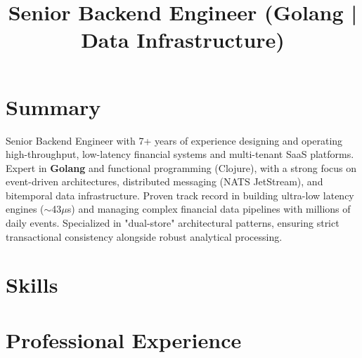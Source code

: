 \documentclass[10pt,a4paper,sans]{moderncv}
\title{Senior Backend Engineer (Golang | Data Infrastructure)}
\begin{document}
\makecvtitle

\section{Summary}
Senior Backend Engineer with 7+ years of experience designing and operating high-throughput, low-latency financial systems and multi-tenant SaaS platforms. Expert in \textbf{Golang} and functional programming (Clojure), with a strong focus on event-driven architectures, distributed messaging (NATS JetStream), and bitemporal data infrastructure. Proven track record in building ultra-low latency engines ($\sim$43$\mu$s) and managing complex financial data pipelines with millions of daily events. Specialized in "dual-store" architectural patterns, ensuring strict transactional consistency alongside robust analytical processing.

\section{Skills}

\section{Professional Experience}
\end{document}
